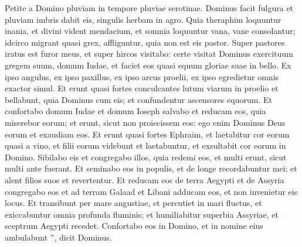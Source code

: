 \begin{biblechapter}
\begin{biblechapter}
\begin{biblechapter}
\begin{biblechapter}
\begin{biblechapter}
\begin{biblechapter}
\begin{biblechapter}
\begin{biblechapter}
\begin{biblechapter}
\begin{biblechapter}
 \verse Petite a Domino pluviam
 in tempore pluviae serotinae.
 Dominus facit fulgura
 et pluviam imbris dabit eis,
 singulis herbam in agro.
 \verse Quia theraphim loquuntur inania,
 et divini vident mendacium,
 et somnia loquuntur vana,
 vane consolantur;
 idcirco migrant quasi grex,
 affliguntur, quia non est eis pastor. 
\verse Super pastores iratus est furor meus,
 et super hircos visitabo:
 certe visitat Dominus exercituum
 gregem suum, domum Iudae,
 et faciet eos quasi equum gloriae suae
 in bello.
 \verse Ex ipso angulus,
 ex ipso paxillus,
 ex ipso arcus proelii,
 ex ipso egredietur omnis exactor simul.
 \verse Et erunt quasi fortes
 conculcantes lutum viarum in proelio
 et bellabunt, quia Dominus cum eis; et confundentur ascensores equorum.
 \verse Et confortabo domum Iudae
 et domum Ioseph salvabo
 et reducam eos, quia miserebor eorum;
 et erunt, sicut non proiecissem eos:
 ego enim Dominus Deus eorum et exaudiam eos.
 \verse Et erunt quasi fortes Ephraim,
 et laetabitur cor eorum quasi a vino,
 et filii eorum videbunt et laetabuntur,
 et exsultabit cor eorum in Domino.
 \verse Sibilabo eis et congregabo illos,
 quia redemi eos,
 et multi erunt, sicut multi ante fuerant.
 \verse Et seminabo eos in populis,
 et de longe recordabuntur mei;
 et alent filios suos et revertentur.
 \verse Et reducam eos de terra Aegypti
 et de Assyria congregabo eos
 et ad terram Galaad et Libani adducam eos,
 et non invenietur eis locus.
 \verse Et transibunt per mare angustiae,
 et percutiet in mari fluctus,
 et exiccabuntur omnia profunda fluminis;
 et humiliabitur superbia Assyriae,
 et sceptrum Aegypti recedet.
 \verse Confortabo eos in Domino,
 et in nomine eius ambulabunt ”,
 dicit Dominus.
 

\end{biblechapter}
\end{biblechapter}
\end{biblechapter}
\end{biblechapter}
\end{biblechapter}
\end{biblechapter}
\end{biblechapter}
\end{biblechapter}
\end{biblechapter}
\end{biblechapter}
